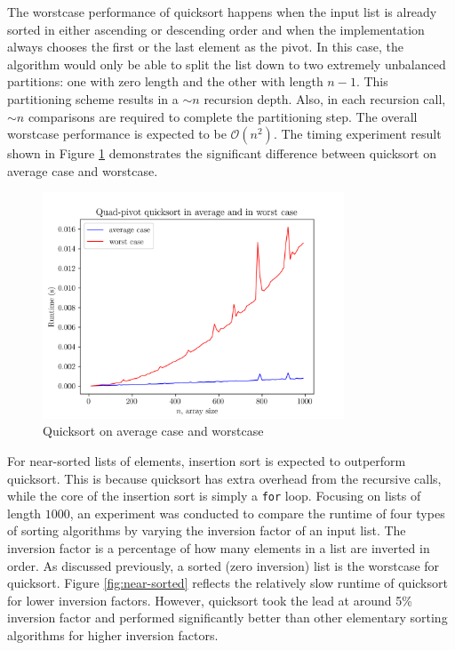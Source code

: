\documentclass[titlepage, 12pt]{article}
\begin{document}
The worstcase performance of quicksort happens when the input list is already
sorted in either ascending or descending order and when the implementation
always chooses the first or the last element as the pivot. In this case, the
algorithm would only be able to split the list down to two extremely unbalanced
partitions: one with zero length and the other with length \( n - 1 \). This
partitioning scheme results in a \( \sim n \) recursion depth. Also, in each
recursion call, \( \sim n \) comparisons are required to complete the
partitioning step. The overall worstcase performance is expected to be \(
\mathcal{O}(n^2) \). The timing experiment result shown in Figure
\ref{fig:worst} demonstrates the significant difference between quicksort on
average case and worstcase.

\begin{figure}[h]
  \centering
  \includegraphics[width=0.8\textwidth]{worst} 
  \caption{Quicksort on average case and worstcase}
  \label{fig:worst}
\end{figure}

For near-sorted lists of elements, insertion sort is expected to outperform
quicksort. This is because quicksort has extra overhead from the recursive
calls, while the core of the insertion sort is simply a \texttt{for} loop.
Focusing on lists of length \( 1000 \), an experiment was conducted to compare
the runtime of four types of sorting algorithms by varying the inversion factor
of an input list. The inversion factor is a percentage of how many elements in a
list are inverted in order. As discussed previously, a sorted (zero inversion)
list is the worstcase for quicksort. Figure \ref{fig:near-sorted} reflects the
relatively slow runtime of quicksort for lower inversion factors. However,
quicksort took the lead at around 5\% inversion factor and performed
significantly better than other elementary sorting algorithms for higher
inversion factors.
\end{document}
